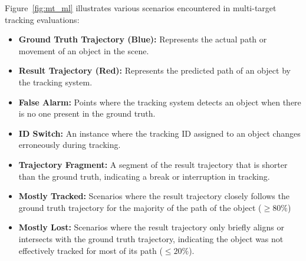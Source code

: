 Figure~\ref{fig:mt_ml} illustrates various scenarios encountered in multi-target tracking evaluations:

\begin{itemize}
    \item \textbf{Ground Truth Trajectory (Blue):} Represents the actual path or movement of an object in the scene.
    \item \textbf{Result Trajectory (Red):} Represents the predicted path of an object by the tracking system.
    \item \textbf{False Alarm:} Points where the tracking system detects an object when there is no one present in the ground truth.
    \item \textbf{ID Switch:} An instance where the tracking ID assigned to an object changes erroneously during tracking.
    \item \textbf{Trajectory Fragment:} A segment of the result trajectory that is shorter than the ground truth, indicating a break or interruption in tracking.
    \item \textbf{Mostly Tracked:} Scenarios where the result trajectory closely follows the ground truth trajectory for the majority of the path of the object (\(\geq 80\%\))
    \item \textbf{Mostly Lost:} Scenarios where the result trajectory only briefly aligns or intersects with the ground truth trajectory, indicating the object was not effectively tracked for most of its path (\(\leq 20\%\)).
\end{itemize}